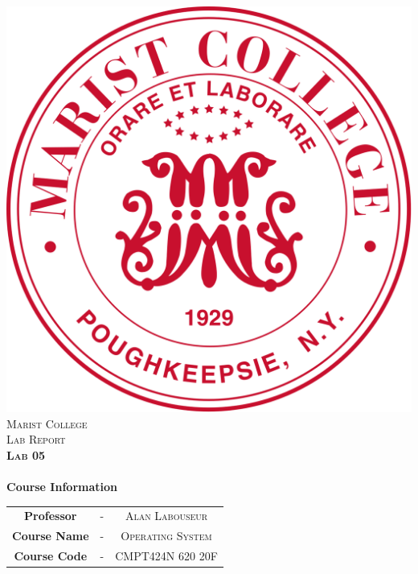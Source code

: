 \includegraphics[scale=0.15]{edit/logo.png}\\[1cm] %

\textsc{\LARGE Marist College}\\[1.5cm] %
\textsc{\Large Lab Report}\\[0.5cm]
\textsc{\Large \textbf{Lab 05}}\\[0.5cm]

\HRule \\[0.6cm]
{\Large\bfseries Course Information}\\[0.4cm] %
\begin{tabular}{c c c}
\large{\bfseries Professor} & - & \large{\textsc{Alan Labouseur}}\\ %
\large{\bfseries Course Name} & - & \large{\textsc{Operating System}}\\ %
\large{\bfseries Course Code} & - & \large{\textsc{CMPT424N 620 20F}}\\[7mm] %
\end{tabular}
\HRule \\[1.5cm]
